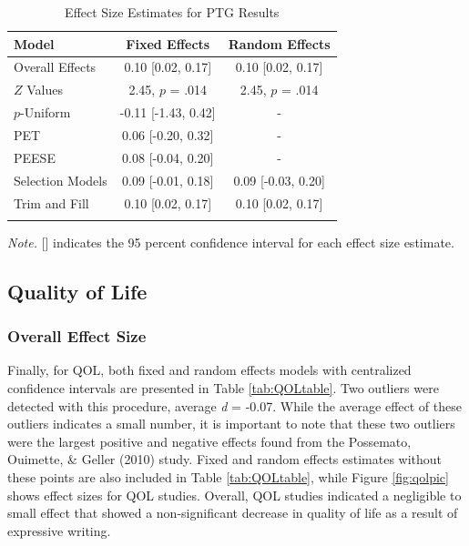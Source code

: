\documentclass[man]{apa6}
\theoremstyle{definition}
\theoremstyle{definition}
\theoremstyle{definition}
\theoremstyle{remark}
\begin{document}
\begin{table}[tbp]
\begin{center}
\begin{threeparttable}
\caption{\label{tab:PTGtable}Effect Size Estimates for PTG Results}
\small{
\begin{tabular}{lcc}
\toprule
Model & Fixed Effects & Random Effects\\
\midrule
Overall Effects & 0.10 [0.02, 0.17] & 0.10 [0.02, 0.17]\\
$Z$ Values & 2.45, $p$ = .014 & 2.45, $p$ = .014\\
$p$-Uniform & -0.11 [-1.43, 0.42] & -\\
PET & 0.06 [-0.20, 0.32] & -\\
PEESE & 0.08 [-0.04, 0.20] & -\\
Selection Models & 0.09 [-0.01, 0.18] & 0.09 [-0.03, 0.20]\\
Trim and Fill & 0.10 [0.02, 0.17] & 0.10 [0.02, 0.17]\\
\bottomrule
\addlinespace
\end{tabular}
}
\begin{tablenotes}[para]
\textit{Note.} [] indicates the 95 percent confidence interval for each effect size estimate.
\end{tablenotes}
\end{threeparttable}
\end{center}
\end{table}

\subsection{Quality of Life}\label{quality-of-life-1}

\subsubsection{Overall Effect Size}\label{overall-effect-size-2}

Finally, for QOL, both fixed and random effects models with centralized
confidence intervals are presented in Table \ref{tab:QOLtable}. Two
outliers were detected with this procedure, average \emph{d} = -0.07.
While the average effect of these outliers indicates a small number, it
is important to note that these two outliers were the largest positive
and negative effects found from the Possemato, Ouimette, \& Geller
(2010) study. Fixed and random effects estimates without these points
are also included in Table \ref{tab:QOLtable}, while Figure
\ref{fig:qolpic} shows effect sizes for QOL studies. Overall, QOL
studies indicated a negligible to small effect that showed a
non-significant decrease in quality of life as a result of expressive
writing.
\end{document}
